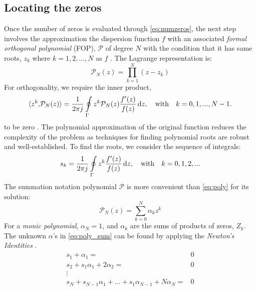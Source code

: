 \documentclass[12pt]{article}
\begin{document}
\subsection*{Locating the zeros}
%
Once the number of zeros is evaluated through \eqref{eq:numzeros}, the next step involves the approximation the dispersion function $f$ with an associated \emph{formal orthogonal polynomial} (FOP), $\mathcal P$ of degree $N$ with the condition that it has same roots, $z_k$ where $k = 1,2,...,N$ as $f$ \cite{Delves1967c,Kravanja1999}. The Lagrange representation is:
%
\begin{equation}
  \mathcal{P}_N(z) = \prod \limits_{k = 1}^N \left(z - z_k \right)
  \label{eq:poly}
\end{equation}
%
For orthogonality, we require the inner product,
%
\begin{equation}
  \langle z^k{,} \mathcal{P}_N(z)\rangle = \frac{1}{2 \pi j} \oint \limits_{\Gamma} z^k \mathcal{P}_N(z) \frac{f'(z)}{f(z)} \dif z, \quad \mathrm{with}\quad k = 0,1,...,N-1.
  \label{eq:fop}
\end{equation}
%
to be zero \cite{Kravanja2000c}. The polynomial approximation of the original function reduces the complexity of the problem as techniques for finding polynomial roots are robust and well-established. To find the roots, we consider the sequence of integrals:
%
\begin{equation}
  s_k = \frac{1}{2 \pi j} \oint \limits_{\Gamma} z^k \frac{f'(z)}{f(z)} \dif z, \quad \mathrm{with}\quad k = 0,1,2,...
  \label{eq:sk}
\end{equation}
%
%
The summation notation polynomial $\mathcal{P}$ is more convenient than \eqref{eq:poly} for its solution:
%
\begin{equation}
  \mathcal{P}_N(z) = \sum \limits_{k = 0}^N \alpha_k z^k
  \label{eq:poly_sum}
\end{equation}
%
For a \emph{monic polynomial}, $\alpha_N = 1$, and $\alpha_k$ are the sums of products of zeros, $Z_k$. The unknown $\alpha$'s in \eqref{eq:poly_sum} can be found by applying the \emph{Newton's Identities} \cite{Kravanja1999}.
%
\begin{equation}
  \begin{aligned}
    s_1 + \alpha_1 ={}& 0 \\
    s_2 + s_1 \alpha_1 + 2 \alpha_2 ={}& 0 \\
    {\vdots}\\
    s_N + s_{N-1} \alpha_{1} + ... + s_1 \alpha_{N-1} + N \alpha_N ={}& 0
    \label{eq:newtid}
  \end{aligned}
\end{equation}
\end{document}
